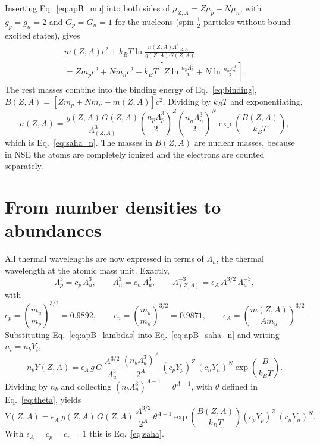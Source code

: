 Inserting Eq.~\ref{eq:apB_mu} into both sides of $\mu_{Z,A}=Z\mu_p+N\mu_n$, with $g_p=g_n=2$ and $G_p=G_n=1$ for the nucleons (spin-$\tfrac12$ particles without bound excited states), gives
\begin{multline}\label{eq:apB_step1}
  m(Z,A)c^2+k_BT\ln\frac{n(Z,A)\Lambda_{(Z,A)}^3}{g(Z,A)G(Z,A)}\\
  =Zm_pc^2+Nm_nc^2+k_BT\left[Z\ln\frac{n_p\Lambda_p^3}{2}+N\ln\frac{n_n\Lambda_n^3}{2}\right].
\end{multline}
The rest masses combine into the binding energy of Eq.~\ref{eq:binding}, $B(Z,A)=[Zm_p+Nm_n-m(Z,A)]c^2$.
Dividing by $k_BT$ and exponentiating,
\begin{equation}\label{eq:apB_saha_n}
  n(Z,A)=\frac{g(Z,A)\,G(Z,A)}{\Lambda_{(Z,A)}^3}\left(\frac{n_p\Lambda_p^3}{2}\right)^{Z}\left(\frac{n_n\Lambda_n^3}{2}\right)^{N}\exp\left(\frac{B(Z,A)}{k_BT}\right),
\end{equation}
which is Eq.~\ref{eq:saha_n}.
The masses in $B(Z,A)$ are nuclear masses, because in NSE the atoms are completely ionized and the electrons are counted separately.

\section{From number densities to abundances}\label{sec:apB_abundances}

All thermal wavelengths are now expressed in terms of $\Lambda_u$, the thermal wavelength at the atomic mass unit.
Exactly,
\begin{equation}\label{eq:apB_lambdas}
  \Lambda_p^3=c_p\,\Lambda_u^3,\qquad \Lambda_n^3=c_n\,\Lambda_u^3,\qquad \Lambda_{(Z,A)}^{-3}=\epsilon_A\,A^{3/2}\,\Lambda_u^{-3},
\end{equation}
with
\begin{equation}\label{eq:apB_mass_factors}
  c_{p}=\left(\frac{m_u}{m_{p}}\right)^{3/2}=0.9892,\qquad c_{n}=\left(\frac{m_u}{m_{n}}\right)^{3/2}=0.9871,\qquad \epsilon_A=\left(\frac{m(Z,A)}{Am_u}\right)^{3/2}.
\end{equation}
Substituting Eq.~\ref{eq:apB_lambdas} into Eq.~\ref{eq:apB_saha_n} and writing $n_i=n_bY_i$,
\begin{equation}\label{eq:apB_exact}
  n_bY(Z,A)=\epsilon_A\,g\,G\,\frac{A^{3/2}}{\Lambda_u^{3}}\,\frac{(n_b\Lambda_u^{3})^{A}}{2^A}\,(c_pY_p)^{Z}\,(c_nY_n)^{N}\exp\left(\frac{B}{k_BT}\right).
\end{equation}
Dividing by $n_b$ and collecting $(n_b\Lambda_u^3)^{A-1}=\theta^{A-1}$, with $\theta$ defined in Eq.~\ref{eq:theta}, yields
\begin{equation}\label{eq:apB_saha_exact}
  Y(Z,A)=\epsilon_A\;g(Z,A)\,G(Z,A)\,\frac{A^{3/2}}{2^A}\,\theta^{A-1}\exp\left(\frac{B(Z,A)}{k_BT}\right)(c_pY_p)^{Z}\,(c_nY_n)^{N}.
\end{equation}
With $\epsilon_A=c_p=c_n=1$ this is Eq.~\ref{eq:saha}.


